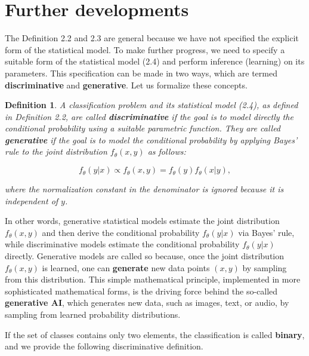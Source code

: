 \documentclass{report}
\newtheorem{definition}{Definition}[chapter]
\begin{document}
\section{Further developments}
The Definition 2.2 and 2.3 are general because we have not specified the explicit form of the statistical model. To make further progress, we need to specify a suitable form of the statistical model (2.4) and perform inference (learning) on its parameters. This specification can be made in two ways, which are termed \textbf{discriminative} and \textbf{generative}. Let us formalize these concepts.

\begin{definition}
A classification problem and its statistical model (2.4), as defined in Definition 2.2, are called \textbf{discriminative} if the goal is to model directly the conditional probability using a suitable parametric function. They are called \textbf{generative} if the goal is to model the conditional probability by applying Bayes' rule to the joint distribution $f_\theta(x,y)$ as follows:

\begin{equation}
f_\theta(y|x) \propto f_\theta(x,y) = f_\theta(y)f_\theta(x|y),
\end{equation}

where the normalization constant in the denominator is ignored because it is independent of $y$.
\end{definition}

In other words, generative statistical models estimate the joint distribution $f_\theta(x,y)$ and then derive the conditional probability $f_\theta(y|x)$ via Bayes' rule, while discriminative models estimate the conditional probability $f_\theta(y|x)$ directly. Generative models are called so because, once the joint distribution $f_\theta(x,y)$ is learned, one can \textbf{generate} new data points $(x,y)$ by sampling from this distribution. This simple mathematical principle, implemented in more sophisticated mathematical forms, is the driving force behind the so-called \textbf{generative AI}, which generates new data, such as images, text, or audio, by sampling from learned probability distributions.

If the set of classes contains only two elements, the classification is called \textbf{binary}, and we provide the following discriminative definition.
\end{document}
